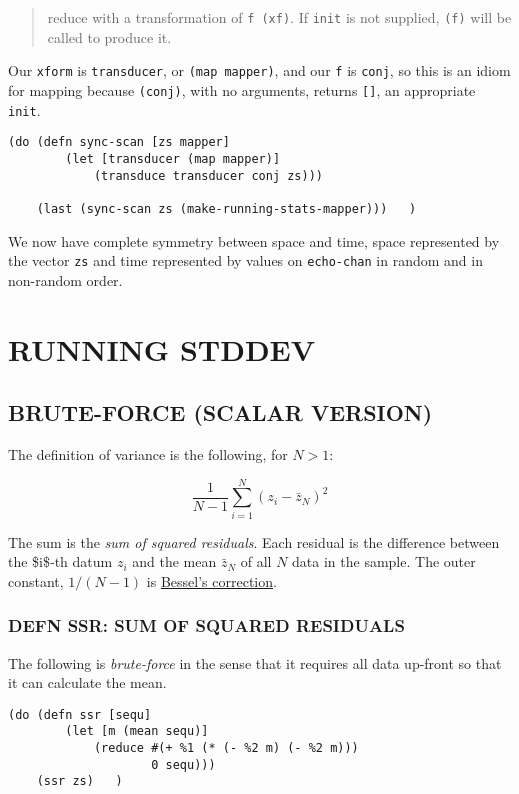 \documentclass[10pt,oneside,x11names]{article}
\begin{document}
\begin{quote}
reduce with a transformation of \texttt{f (xf)}. If \texttt{init} is not supplied,
\texttt{(f)} will be called to produce it.
\end{quote}

Our \texttt{xform} is \texttt{transducer}, or \texttt{(map mapper)}, and our \texttt{f} is \texttt{conj},
so this is an idiom for mapping because \texttt{(conj)}, with no arguments,
returns \texttt{[]}, an appropriate \texttt{init}.

\begin{verbatim}
(do (defn sync-scan [zs mapper]
        (let [transducer (map mapper)]
            (transduce transducer conj zs)))

    (last (sync-scan zs (make-running-stats-mapper)))   )
\end{verbatim}

We now have complete symmetry between space and time, space represented by the
vector \texttt{zs} and time represented by values on \texttt{echo-chan} in random and in
non-random order.

\section{RUNNING STDDEV}
\label{running-stddev}
\subsection{BRUTE-FORCE (SCALAR VERSION)}
\label{brute-force-scalar-version}
The definition of variance is the following, for \(N>1\):

$$\frac{1}{N-1}\sum\limits_{i=1}^{N}\left({z_i-\bar{z}_N}\right)^2$$

The sum is the \emph{sum of squared residuals}. Each residual is the difference
between the \$i\$‑th datum \(z_i\) and the mean \(\bar{z}_N\) of all \(N\) data in the
sample. The outer constant, \(1/(N-1)\) is \href{https://en.wikipedia.org/wiki/Bessel's\_correction}{Bessel's correction}.

\subsubsection{DEFN SSR: SUM OF SQUARED RESIDUALS}
\label{ssr-sum-of-squared-residuals}
The following is \emph{brute-force} in the sense that it requires all data
up-front so that it can calculate the mean.

\begin{verbatim}
(do (defn ssr [sequ]
        (let [m (mean sequ)]
            (reduce #(+ %1 (* (- %2 m) (- %2 m)))
                    0 sequ)))
    (ssr zs)   )
\end{verbatim}
\end{document}
